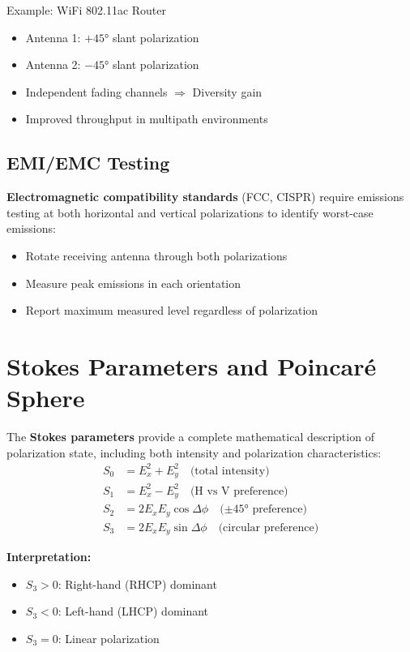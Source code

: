 \begin{center}
\begin{calloutbox}{Example: WiFi 802.11ac Router}
\begin{itemize}
\item Antenna 1: $+45°$ slant polarization
\item Antenna 2: $-45°$ slant polarization
\item Independent fading channels $\Rightarrow$ Diversity gain
\item Improved throughput in multipath environments
\end{itemize}
\end{calloutbox}

\subsection{EMI/EMC Testing}

\textbf{Electromagnetic compatibility standards} (FCC, CISPR) require emissions testing at both horizontal and vertical polarizations to identify worst-case emissions:
\begin{itemize}
\item Rotate receiving antenna through both polarizations
\item Measure peak emissions in each orientation
\item Report maximum measured level regardless of polarization
\end{itemize}

\section{Stokes Parameters and Poincaré Sphere}

The \textbf{Stokes parameters} provide a complete mathematical description of polarization state, including both intensity and polarization characteristics:
\begin{align}
S_0 &= E_x^2 + E_y^2 \quad \text{(total intensity)} \label{eq:stokes-s0} \\
S_1 &= E_x^2 - E_y^2 \quad \text{(H vs V preference)} \label{eq:stokes-s1} \\
S_2 &= 2E_xE_y\cos\Delta\phi \quad \text{($\pm 45°$ preference)} \label{eq:stokes-s2} \\
S_3 &= 2E_xE_y\sin\Delta\phi \quad \text{(circular preference)} \label{eq:stokes-s3}
\end{align}

\textbf{Interpretation:}
\begin{itemize}
\item $S_3 > 0$: Right-hand (RHCP) dominant
\item $S_3 < 0$: Left-hand (LHCP) dominant
\item $S_3 = 0$: Linear polarization
\end{itemize}


\end{center}
